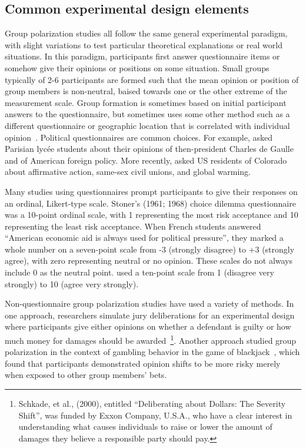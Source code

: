 \subsection{Common experimental design elements}

Group polarization studies all follow the same general experimental paradigm,
with slight variations to test particular theoretical explanations or 
real world situations. In this paradigm, participants first answer questionnaire
items or somehow give their opinions or positions on some situation. Small groups
typically of 2-6 participants are formed such that the mean opinion or position
of group members is non-neutral, baised towards one or the other extreme of 
the measurement scale. Group formation is sometimes based on initial participant answers to
the questionnaire, but sometimes uses some other method such as a 
different questionnaire \cite{Myers1970} or geographic location that is correlated with individual
opinion~\cite{Schkade2010}. Political questionnaires are common choices.
For example,  asked Parisian lycée students about their 
opinions of then-president Charles de Gaulle and of American foreign policy.
More recently,  asked US residents of Colorado
about affirmative action, same-sex civil unions, and global warming. 

Many studies using questionnaires
prompt participants to give their responses on an ordinal, Likert-type scale.
Stoner's (1961; 1968) choice dilemma questionnaire was a 10-point ordinal
scale, with 1 representing the most risk acceptance and 10 representing the
least risk acceptance. When French students answered ``American economic aid
is always used for political pressure'', they marked a whole number on
a seven-point scale from
-3 (strongly disagree) to +3 (strongly agree), with zero representing 
neutral or no opinion. These scales do not always include 0 as the neutral
point.  used a ten-point scale from 1 (disagree very strongly)
to 10 (agree very strongly). 

Non-questionnaire group polarization studies have used a variety of 
methods. In one approach, researchers simulate jury deliberations
for an experimental design where participants give either opinions
on whether a defendant is guilty or how much money for damages should be
awarded~\cite{Kaplan1977,Kaplan1977a,Schkade2000,Schkade2007,Sunstein2000}\footnote{
Schkade, et al., (2000), entitled ``Deliberating about Dollars: The Severity Shift'',
was funded by Exxon Company, U.S.A., who have a clear interest in understanding
what causes individuals to raise or lower the amount of damages they believe
a responsible party should pay.}. Another approach studied group
polarization in the context of gambling behavior in the game of 
blackjack~\cite{Blascovich1974,Blascovich1975,Blascovich1976}, which
found that participants demonstrated opinion shifts to be more risky merely
when exposed to other group members' bets. 

